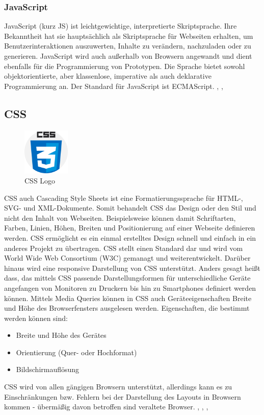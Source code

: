\subsubsection{JavaScript}
JavaScript (kurz JS) ist leichtgewichtige, interpretierte Skriptsprache. Ihre Bekanntheit hat 
sie hauptsächlich als Skriptsprache für Webseiten erhalten, um Benutzerinteraktionen auszuwerten, 
Inhalte zu verändern, nachzuladen oder zu generieren. JavaScript wird auch außerhalb von Browsern 
angewandt und dient ebenfalls für die Programmierung von Prototypen. Die Sprache bietet 
sowohl objektorientierte, aber klassenlose, imperative als auch deklarative Programmierung an. 
Der Standard für JavaScript ist ECMAScript. \cite{noauthor_javascript_nodate}, \cite{noauthor_javascript_2022}, \cite{noauthor_javascript-grundlagen_nodate}

\subsection{CSS}
\begin{figure}
    \begin{center}
      \includegraphics[width=0.2\textwidth]{pics/CSS_Logo.png}
      \caption{CSS Logo}
    \end{center}
\end{figure} 
CSS auch Cascading Style Sheets ist eine Formatierungssprache für HTML-, SVG- und XML-Dokumente.
Somit behandelt CSS das Design oder den Stil und nicht den Inhalt von Webseiten. 
Beispielsweise können damit Schriftarten, Farben, Linien, Höhen, Breiten und Positionierung auf einer 
Webseite definieren werden. CSS ermöglicht es ein einmal erstelltes Design schnell und 
einfach in ein anderes Projekt zu übertragen. CSS stellt einen Standard dar und wird vom 
World Wide Web Consortium (W3C) gemanagt und weiterentwickelt. 
\newline
Darüber hinaus wird eine responsive Darstellung von CSS unterstützt. Anders gesagt heißt dass, das mittels CSS 
passende Darstellungsformen für unterschiedliche Geräte angefangen von Monitoren zu Druckern 
bis hin zu Smartphones definiert werden können. Mittels Media Queries können in CSS auch Geräteeigenschaften Breite und Höhe des Browserfensters
ausgelesen werden. Eigenschaften, die bestimmt werden können sind:
\begin{itemize}
    \item Breite und Höhe des Gerätes
    \item Orientierung (Quer- oder Hochformat)
    \item Bildschirmauflösung
\end{itemize}
CSS wird von allen gängigen Browsern 
unterstützt, allerdings kann es zu Einschränkungen bzw. Fehlern bei der Darstellung des Layouts in 
Browsern kommen - übermäßig davon betroffen sind veraltete Browser. \cite{noauthor_css_nodate}, \cite{noauthor_cascading_2022}, \cite{noauthor_css_nodate-1}, \cite{noauthor_css_nodate-2}

